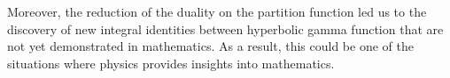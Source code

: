 Moreover, the reduction of the duality on the partition function led us to the discovery of new integral identities between hyperbolic gamma function that are not yet demonstrated in mathematics.
As a result, this could be one of the situations where physics provides insights into mathematics.












